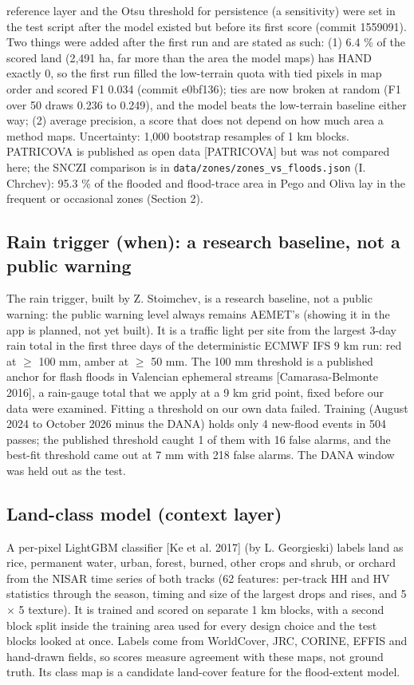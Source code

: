 \documentclass[10pt,twocolumn]{article}
\begin{document}
reference layer and the Otsu threshold for persistence (a sensitivity) were set in the test script after the model existed but before its first score (commit 1559091). Two things were added after the first run and are stated as such: (1) 6.4 \% of the scored land (2,491 ha, far more than the area the model maps) has HAND exactly 0, so the first run filled the low-terrain quota with tied pixels in map order and scored F1 0.034 (commit e0bf136); ties are now broken at random (F1 over 50 draws 0.236 to 0.249), and the model beats the low-terrain baseline either way; (2) average precision, a score that does not depend on how much area a method maps. Uncertainty: 1,000 bootstrap resamples of 1 km blocks. PATRICOVA is published as open data [PATRICOVA] but was not compared here; the SNCZI comparison is in \texttt{data/\allowbreak{}zones/\allowbreak{}zones\_\allowbreak{}vs\_\allowbreak{}floods.\allowbreak{}json} (I. Chrchev): 95.3 \% of the flooded and flood-trace area in Pego and Oliva lay in the frequent or occasional zones (Section 2).

\subsection{Rain trigger (when): a research baseline, not a public warning}
The rain trigger, built by Z. Stoimchev, is a research baseline, not a public warning: the public warning level always remains AEMET's (showing it in the app is planned, not yet built). It is a traffic light per site from the largest 3-day rain total in the first three days of the deterministic ECMWF IFS 9 km run: red at $\geq$ 100 mm, amber at $\geq$ 50 mm. The 100 mm threshold is a published anchor for flash floods in Valencian ephemeral streams [Camarasa-Belmonte 2016], a rain-gauge total that we apply at a 9 km grid point, fixed before our data were examined. Fitting a threshold on our own data failed. Training (August 2024 to October 2026 minus the DANA) holds only 4 new-flood events in 504 passes; the published threshold caught 1 of them with 16 false alarms, and the best-fit threshold came out at 7 mm with 218 false alarms. The DANA window was held out as the test.

\subsection{Land-class model (context layer)}
A per-pixel LightGBM classifier [Ke et al. 2017] (by L. Georgieski) labels land as rice, permanent water, urban, forest, burned, other crops and shrub, or orchard from the NISAR time series of both tracks (62 features: per-track HH and HV statistics through the season, timing and size of the largest drops and rises, and 5 $\times$ 5 texture). It is trained and scored on separate 1 km blocks, with a second block split inside the training area used for every design choice and the test blocks looked at once. Labels come from WorldCover, JRC, CORINE, EFFIS and hand-drawn fields, so scores measure agreement with these maps, not ground truth. Its class map is a candidate land-cover feature for the flood-extent model.
\end{document}
